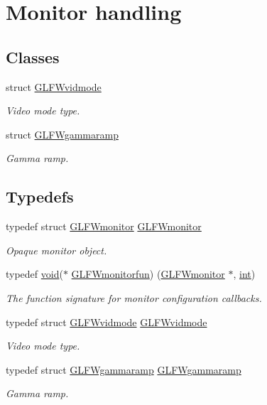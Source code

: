 \hypertarget{group__monitor}{}\section{Monitor handling}
\label{group__monitor}
\subsection*{Classes}
\begin{DoxyCompactItemize}
\item 
struct \hyperlink{struct_g_l_f_wvidmode}{G\+L\+F\+Wvidmode}
\begin{DoxyCompactList}\small\item\em Video mode type. \end{DoxyCompactList}\item 
struct \hyperlink{struct_g_l_f_wgammaramp}{G\+L\+F\+Wgammaramp}
\begin{DoxyCompactList}\small\item\em Gamma ramp. \end{DoxyCompactList}\end{DoxyCompactItemize}
\subsection*{Typedefs}
\begin{DoxyCompactItemize}
\item 
typedef struct \hyperlink{group__monitor_ga8d9efd1cde9426692c73fe40437d0ae3}{G\+L\+F\+Wmonitor} \hyperlink{group__monitor_ga8d9efd1cde9426692c73fe40437d0ae3}{G\+L\+F\+Wmonitor}
\begin{DoxyCompactList}\small\item\em Opaque monitor object. \end{DoxyCompactList}\item 
typedef \hyperlink{wglew_8h_aeea6e3dfae3acf232096f57d2d57f084}{void}($\ast$ \hyperlink{group__monitor_ga8a7ee579a66720f24d656526f3e44c63}{G\+L\+F\+Wmonitorfun}) (\hyperlink{group__monitor_ga8d9efd1cde9426692c73fe40437d0ae3}{G\+L\+F\+Wmonitor} $\ast$, \hyperlink{wglew_8h_a500a82aecba06f4550f6849b8099ca21}{int})
\begin{DoxyCompactList}\small\item\em The function signature for monitor configuration callbacks. \end{DoxyCompactList}\item 
typedef struct \hyperlink{struct_g_l_f_wvidmode}{G\+L\+F\+Wvidmode} \hyperlink{group__monitor_gae48aadf4ea0967e6605c8f58fa5daccb}{G\+L\+F\+Wvidmode}
\begin{DoxyCompactList}\small\item\em Video mode type. \end{DoxyCompactList}\item 
typedef struct \hyperlink{struct_g_l_f_wgammaramp}{G\+L\+F\+Wgammaramp} \hyperlink{group__monitor_gaec0bd37af673be8813592849f13e02f0}{G\+L\+F\+Wgammaramp}
\begin{DoxyCompactList}\small\item\em Gamma ramp. \end{DoxyCompactList}\end{DoxyCompactItemize}
